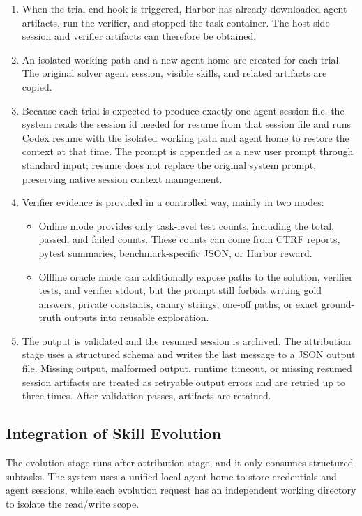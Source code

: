 \begin{enumerate}
    \item When the trial-end hook is triggered, Harbor has already downloaded agent artifacts, run the verifier, and stopped the task container. The host-side session and verifier artifacts can therefore be obtained.
    \item An isolated working path and a new agent home are created for each trial. The original solver agent session, visible skills, and related artifacts are copied.
    \item Because each trial is expected to produce exactly one agent session file, the system reads the session id needed for resume from that session file and runs Codex resume with the isolated working path and agent home to restore the context at that time. The prompt is appended as a new user prompt through standard input; resume does not replace the original system prompt, preserving native session context management.
    \item Verifier evidence is provided in a controlled way, mainly in two modes:
    \begin{itemize}
        \item Online mode provides only task-level test counts, including the total, passed, and failed counts. These counts can come from CTRF reports, pytest summaries, benchmark-specific JSON, or Harbor reward.
        \item Offline oracle mode can additionally expose paths to the solution, verifier tests, and verifier stdout, but the prompt still forbids writing gold answers, private constants, canary strings, one-off paths, or exact ground-truth outputs into reusable exploration.
    \end{itemize}
    \item The output is validated and the resumed session is archived. The attribution stage uses a structured schema and writes the last message to a JSON output file. Missing output, malformed output, runtime timeout, or missing resumed session artifacts are treated as retryable output errors and are retried up to three times. After validation passes, artifacts are retained.
\end{enumerate}

\subsection{Integration of Skill Evolution}
The evolution stage runs after attribution stage, and it only consumes structured subtasks. The system uses a unified local agent home to store credentials and agent sessions, while each evolution request has an independent working directory to isolate the read/write scope.

